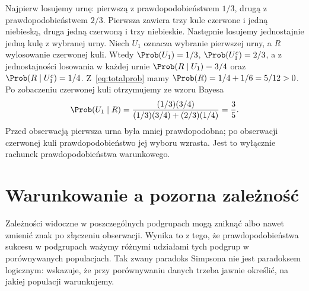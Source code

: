 \begin{przyklad}
Najpierw losujemy urnę: pierwszą z prawdopodobieństwem $1/3$,
drugą z prawdopodobieństwem $2/3$. Pierwsza zawiera trzy kule
czerwone i jedną niebieską, druga jedną czerwoną i trzy niebieskie.
Następnie losujemy jednostajnie jedną kulę z wybranej urny.
Niech $U_1$ oznacza wybranie pierwszej urny, a $R$ wylosowanie
czerwonej kuli. Wtedy $\Prob(U_1)=1/3$, $\Prob(U_1^c)=2/3$,
a z jednostajności losowania w każdej urnie
$\Prob(R\mid U_1)=3/4$ oraz $\Prob(R\mid U_1^c)=1/4$.
Z~\eqref{eq:totalprob} mamy $\Prob(R)=1/4+1/6=5/12>0$.
Po zobaczeniu czerwonej kuli otrzymujemy ze wzoru Bayesa
\[
\Prob(U_1\mid R)
=\frac{(1/3)(3/4)}{(1/3)(3/4)+(2/3)(1/4)}
=\frac35.
\]
Przed obserwacją pierwsza urna była mniej prawdopodobna;
po obserwacji czerwonej kuli prawdopodobieństwo jej wyboru wzrasta.
Jest to wyłącznie rachunek prawdopodobieństwa warunkowego.
\end{przyklad}

\section{Warunkowanie a pozorna zależność}
Zależności widoczne w poszczególnych podgrupach mogą zniknąć
albo nawet zmienić znak po złączeniu obserwacji. Wynika to z tego,
że prawdopodobieństwa sukcesu w podgrupach ważymy różnymi
udziałami tych podgrup w porównywanych populacjach.
Tak zwany paradoks Simpsona nie jest paradoksem logicznym:
wskazuje, że przy porównywaniu danych trzeba jawnie określić,
na jakiej populacji warunkujemy.

